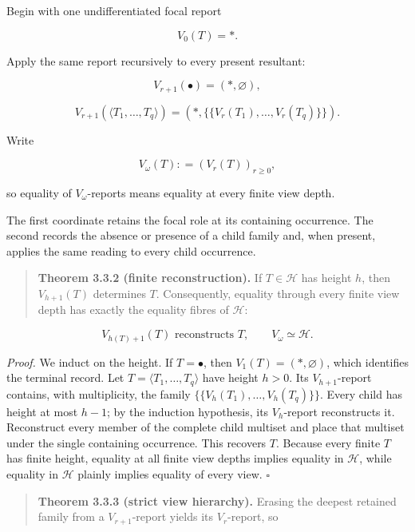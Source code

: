 \documentclass[11pt,a4paper]{article}
\begin{document}
Begin with one undifferentiated focal report

\[V_{0}(T) = *.\]

Apply the same report recursively to every present resultant:

\[V_{r + 1}( \bullet ) = (*,\varnothing),\]

\[V_{r + 1}\left( \langle T_{1},\ldots,T_{q}\rangle \right) = \left( *,\{\{ V_{r}\left( T_{1} \right),\ldots,V_{r}\left( T_{q} \right)\}\} \right).\]

Write

\[V_{\omega}(T): = \left( V_{r}(T) \right)_{r \geq 0},\]

so equality of \(V_{\omega}\)-reports means equality at every finite
view depth.

The first coordinate retains the focal role at its containing
occurrence. The second records the absence or presence of a child family
and, when present, applies the same reading to every child occurrence.

\begin{quote}
\textbf{Theorem 3.3.2 (finite reconstruction).} If \(T \in \mathcal{H}\)
has height \(h\), then \(V_{h + 1}(T)\) determines \(T\). Consequently,
equality through every finite view depth has exactly the equality fibres
of \(\mathcal{H}\):
\end{quote}

\[\boxed{V_{h(T) + 1}(T)\text{ reconstructs }T,\quad\quad V_{\omega} \simeq \mathcal{H}.}\]

\emph{Proof.} We induct on the height. If \(T = \bullet\), then
\(V_{1}(T) = (*,\varnothing)\), which identifies the terminal record.
Let \(T = \langle T_{1},\ldots,T_{q}\rangle\) have height \(h > 0\). Its
\(V_{h + 1}\)-report contains, with multiplicity, the family
\(\{\{ V_{h}\left( T_{1} \right),\ldots,V_{h}\left( T_{q} \right)\}\}\).
Every child has height at most \(h - 1\); by the induction hypothesis,
its \(V_{h}\)-report reconstructs it. Reconstruct every member of the
complete child multiset and place that multiset under the single
containing occurrence. This recovers \(T\). Because every finite \(T\)
has finite height, equality at all finite view depths implies equality
in \(\mathcal{H}\), while equality in \(\mathcal{H}\) plainly implies
equality of every view. \(\ensuremath{\square}\)

\begin{quote}
\textbf{Theorem 3.3.3 (strict view hierarchy).} Erasing the deepest
retained family from a \(V_{r + 1}\)-report yields its \(V_{r}\)-report,
so
\end{quote}
\end{document}
